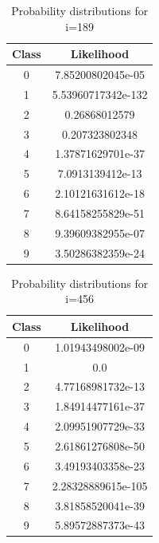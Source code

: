 \documentclass[11pt]{article}
\begin{document}
\begin{table}[!th]
\centering
\begin{tabular}{|c|c|}
\hline
Class & Likelihood \\
\hline
0 & 7.85200802045e-05 \\
1 & 5.53960717342e-132 \\
2 & 0.26868012579 \\
3 & 0.207323802348 \\
4 & 1.37871629701e-37 \\
5 & 7.0913139412e-13 \\
6 & 2.10121631612e-18 \\
7 & 8.64158255829e-51 \\
8 & 9.39609382955e-07 \\
9 & 3.50286382359e-24 \\
\hline
\end{tabular}
\caption{Probability distributions for i=189}
\label{ex:table}
\end{table}

\begin{table}[!th]
\centering
\begin{tabular}{|c|c|}
\hline
Class & Likelihood \\
\hline
0 & 1.01943498002e-09 \\
1 & 0.0 \\
2 & 4.77168981732e-13 \\
3 & 1.84914477161e-37 \\
4 & 2.09951907729e-33 \\
5 & 2.61861276808e-50 \\
6 & 3.49193403358e-23 \\
7 & 2.28328889615e-105 \\
8 & 3.81858520041e-39 \\
9 & 5.89572887373e-43 \\
\hline
\end{tabular}
\caption{Probability distributions for i=456}
\label{ex:table}
\end{table}
\end{document}
